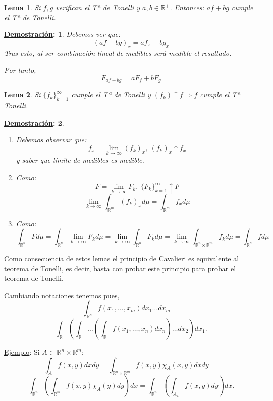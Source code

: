 \documentclass[10pt,a4paper,openright]{book}
\theoremstyle{break}
\newtheorem*{lema}{Lema}
\newtheorem*{demo}{\underline{Demostración}:}
\newcommand{\dif}[1]{ d#1}
\begin{document}
\begin{lema}
Si $f, g$ verifican el Tª de Tonelli y $a, b \in \mathbb{R}^+$. Entonces: 
$af + bg$ cumple el Tª de Tonelli.
\end{lema}
\begin{demo}
Debemos ver que:
$$\left(af + bg\right)_x = af_x + bg_x$$
Tras esto, al ser combinación lineal de medibles será medible el resultado.

Por tanto,
$$F_{af + bg} = aF_f + bF_g$$ 
\end{demo}

\begin{lema}
Si $\{f_k\}_{k=1}^{\infty}$ cumple el Tª de Tonelli y $\left(f_k\right)\uparrow f \Rightarrow f$ cumple el Tª Tonelli. 
\end{lema}
\begin{demo}
\begin{enumerate}
    \item Debemos observar que: 
    $$f_x = \lim_{k \rightarrow \infty} \left(f_k\right)_x,\ \left(f_k\right)_x \uparrow f_x $$
    y saber que límite de medibles es medible.
    \item Como: 
    $$F = \lim_{k \rightarrow \infty}F_k,\ \{F_k\}_{k=1}^{\infty} \uparrow F$$
    $$\lim_{k \rightarrow \infty} \int_{\mathbb{R}^m} \left(f_k\right)_x \dif{\mu} = \int_{\mathbb{R}^m} f_x \dif{\mu} $$
    \item Como: 
    $$\int_{\mathbb{R}^n} F \dif{\mu} = \int_{\mathbb{R}^n} \lim_{k \rightarrow \infty}F_k  \dif{\mu} = \lim_{k \rightarrow \infty}\int_{\mathbb{R}^n} F_k \dif{\mu} = \lim_{k \rightarrow \infty} \int_{\mathbb{R}^n \times \mathbb{R}^m} f_k  \dif{\mu} = \int_{\mathbb{R}^n} f \dif{\mu}  $$
\end{enumerate}
\end{demo}

Como consecuencia de estos lemas el principio de Cavalieri es equivalente al teorema de Tonelli, es decir, basta con probar este principio para probar el teorema de Tonelli.

Cambiando notaciones tenemos pues, 
$$\int_{\mathbb{R}^n} f \left(x_1, \ldots, x_m\right) \dif{x_1}\ldots\dif{x_m} = $$
$$\int_{\mathbb{R}} \left(\int_{\mathbb{R}} \ldots \left( \int_{\mathbb{R}} f \left(x_1, \ldots, x_n\right) \dif{x_n}\right)\ldots \dif{x_2}\right) \dif{x_1}.$$

\underline{Ejemplo}: 
Si $A \subset \mathbb{R}^n \times \mathbb{R}^m$:
$$\int_A f \left(x, y\right) \dif{x} \dif{y} = \int_{\mathbb{R}^n \times \mathbb{R}^m} f \left(x, y\right) \chi_A \left(x, y\right) \dif{x}\dif{y} = $$
$$\int_{\mathbb{R}^n} \left(\int_{\mathbb{R}^m} f \left(x, y\right) \chi_A \left(y\right) \dif{y} \right) \dif{x} = \int_{\mathbb{R}^n} \left(\int_{A_x} f \left(x, y\right) \dif{y}\right) \dif{x}.$$
\end{document}
